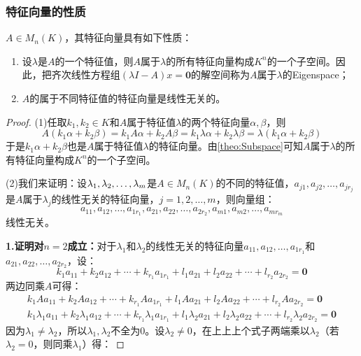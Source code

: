 \subsubsection{特征向量的性质}
\begin{property}\label{prop:Eigenvector}
	$A\in M_{n}(K)$，其特征向量具有如下性质：
	\begin{enumerate}
		\item 设$\lambda$是$A$的一个特征值，则$A$属于$\lambda$的所有特征向量构成$K^n$的一个子空间。因此，把齐次线性方程组$(\lambda I-A)x=\mathbf{0}$的解空间称为$A$属于$\lambda$的\gls{Eigenspace}；
		\item $A$的属于不同特征值的特征向量是线性无关的。
	\end{enumerate}
\end{property}
\begin{proof}
	(1)任取$k_1,k_2\in K$和$A$属于特征值$\lambda$的两个特征向量$\alpha,\beta$，则
	\begin{equation*}
		A(k_1\alpha+k_2\beta)=k_1A\alpha+k_2A\beta=k_1\lambda\alpha+k_2\lambda\beta=\lambda(k_1\alpha+k_2\beta)
	\end{equation*}
	于是$k_1\alpha+k_2\beta$也是$A$属于特征值$\lambda$的特征向量。由\cref{theo:Subspace}可知$A$属于$\lambda$的所有特征向量构成$K^n$的一个子空间。\par
	(2)我们来证明：设$\lambda_1, \lambda_2, \dots, \lambda_{m}$是$A\in M_{n}(K)$的不同的特征值，$a_{j1},a_{j2},\dots,a_{jr_j}$是$A$属于$\lambda_j$的线性无关的特征向量，$j=1,2,\dots,m$，则向量组：
	\begin{equation*}
		a_{11},a_{12},\dots,a_{1r_1},a_{21},a_{22},\dots,a_{2r_2},a_{m1},a_{m2},\dots,a_{mr_m}
	\end{equation*}
	线性无关。\par
	\textbf{1.证明对$n=2$成立：}对于$\lambda_1$和$\lambda_2$的线性无关的特征向量$a_{11},a_{12},\dots,a_{1r_1}$和$a_{21},a_{22},\dots,a_{2r_2}$，设：
	\begin{equation*}
		k_1a_{11}+k_2a_{12}+\cdots+k_{r_1}a_{1r_1}+l_1a_{21}+l_2a_{22}+\cdots+l_{r_2}a_{2r_2}=\mathbf{0}
	\end{equation*}
	两边同乘$A$可得：
	\begin{gather*}
		k_1Aa_{11}+k_2Aa_{12}+\cdots+k_{r_1}Aa_{1r_1}+l_1Aa_{21}+l_2Aa_{22}+\cdots+l_{r_2}Aa_{2r_2}=\mathbf{0} \\
		k_1\lambda_1a_{11}+k_2\lambda_1a_{12}+\cdots+k_{r_1}\lambda_1a_{1r_1}+l_1\lambda_2a_{21}+l_2\lambda_2a_{22}+\cdots+l_{r_2}\lambda_2a_{2r_2}=\mathbf{0}
	\end{gather*}
	因为$\lambda_1\ne\lambda_2$，所以$\lambda_1,\lambda_2$不全为$0$。设$\lambda_2\ne0$，在上上上个式子两端乘以$\lambda_2$（若$\lambda_2=0$，则同乘$\lambda_1$）得：

\end{proof}
